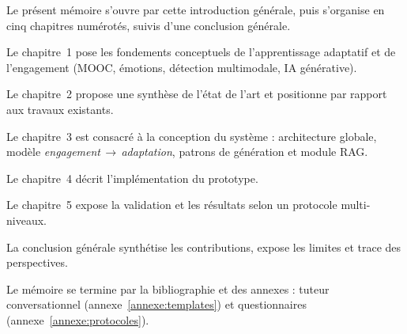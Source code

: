 Le présent mémoire s'ouvre par cette introduction générale,
puis s'organise en cinq chapitres numérotés, suivis d'une
conclusion générale.

Le chapitre~1 pose les fondements conceptuels de l'apprentissage
adaptatif et de l'engagement (MOOC, émotions, détection multimodale, IA
générative).

Le chapitre~2 propose une synthèse de l'état de l'art et positionne
\emolearn{} par rapport aux travaux existants.

Le chapitre~3 est consacré à la conception du système :
architecture globale, modèle
\emph{engagement\,$\rightarrow$\,adaptation}, patrons de génération et
module RAG.

Le chapitre~4 décrit l'implémentation du prototype.

Le chapitre~5 expose la validation et les résultats selon un
protocole multi-niveaux.

La conclusion générale synthétise les contributions, expose les
limites et trace des perspectives.

Le mémoire se termine par la bibliographie et des annexes : tuteur
conversationnel (annexe~\ref{annexe:templates}) et questionnaires
(annexe~\ref{annexe:protocoles}).
